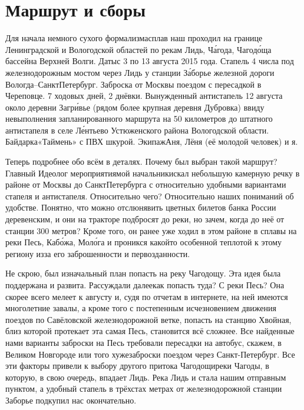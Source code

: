 \chapter{Маршрут и сборы}

Для начала немного сухого формализма\mdash сплав наш проходил на границе Ленинградской и Вологодской областей по рекам Лидь, Ч\'{а}года, Чагод\'{о}ща бассейна Верхней Волги. Даты\mdash с 3 по 13 августа 2015 года. Стапель 4 числа под железнодорожным мостом через Лидь у станции З\'{а}борье железной дороги Вологда\nobreakdash--Санкт\sdash Петербург. Заброска от Москвы поездом с пересадкой в Череповце. 7 ходовых дней, 2 днёвки. Вынужденный антистапель 12 августа около деревни Загр\'{и}вье (рядом более крупная деревня Дубровка) ввиду невыполнения запланированного маршрута на 50 километров до штатного антистапеля в селе Л\'{е}нтьево Устюженского района Вологодской области.  Байдарка\mdash «Таймень» с ПВХ шкурой. Экипаж\mdash Аня, Лёня (её молодой человек) и я.

Теперь подробнее обо всём в деталях. Почему был выбран такой маршрут? Главный Идеолог мероприятия\mdash мой начальник\mdash искал небольшую камерную речку в районе от Москвы до Санкт\sdash Петербурга с относительно удобными вариантами стапеля и антистапеля. Относительно чего? Относительно наших пониманий об удобстве. Понятно, что можно отслюнявить цветных билетов банка России деревенским, и они на тракторе подбросят до реки, но зачем, когда до неё от станции 300 метров? Кроме того, он ранее уже ходил в этом районе в сплавы на реки Песь, Каб\'{о}жа, Мол\'{о}га и проникся какой\sdash то особенной теплотой к этому региону из\sdash за его заброшенности и первозданности.

Не скрою, был изначальный план попасть на реку Чагодощу. Эта идея была поддержана и развита. Рассуждали далее\mdash как попасть туда? С реки Песь? Она скорее всего мелеет к августу и, судя по отчетам в интернете, на ней имеются многолетние завалы, а кроме того с постепенным исчезновением движения поездов по Савёловской железнодорожной ветке, попасть на станцию Хвойная, близ которой протекает эта самая Песь, становится всё сложнее. Все найденные нами варианты заброски на Песь требовали пересадки на автобус, скажем, в Великом Новгороде или того хуже\mdash заброски поездом через Санкт-Петербург. Все эти факторы привели к выбору другого притока Чагодощи\mdash реки Чагоды, в которую, в свою очередь, впадает Лидь. Река Лидь и стала нашим отправным пунктом, а удобный стапель в трёхстах метрах от железнодорожной станции Заборье подкупил нас окончательно. 

